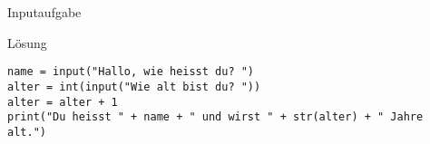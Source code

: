 \begin{frame}[fragile]{Inputaufgabe}
\begin{exampleblock}{Lösung}
	\begin{lstlisting}
name = input("Hallo, wie heisst du? ")
alter = int(input("Wie alt bist du? "))
alter = alter + 1
print("Du heisst " + name + " und wirst " + str(alter) + " Jahre alt.")
	\end{lstlisting}
\end{exampleblock}
\end{frame}
